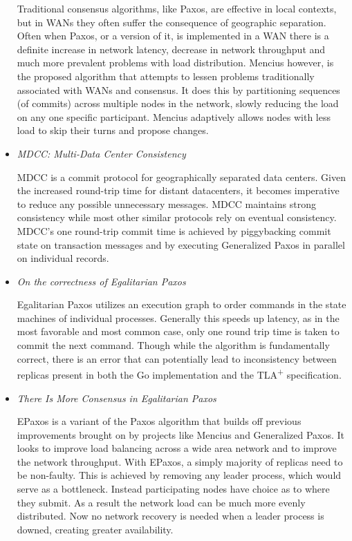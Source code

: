\documentclass{article}
\begin{document}
\begin{itemize}
	Traditional consensus algorithms, like Paxos, are effective in local contexts, but in WANs they often suffer the consequence of geographic separation.
	Often when Paxos, or a version of it, is implemented in a WAN there is a definite increase in network latency, decrease in network throughput and much more prevalent problems with load distribution.
	Mencius however, is the proposed algorithm that attempts to lessen problems traditionally associated with WANs and consensus.
	It does this by partitioning sequences (of commits) across multiple nodes in the network, slowly reducing the load on any one specific participant. Mencius adaptively allows nodes with less load to skip their turns and propose changes.

	\item
	\textit{MDCC: Multi-Data Center Consistency} \cite{MDCC}

	MDCC is a commit protocol for geographically separated data centers.
	Given the increased round-trip time for distant datacenters, it becomes imperative to reduce any possible unnecessary messages. MDCC maintains strong consistency while most other similar protocols rely on eventual consistency.
	MDCC's one round-trip commit time is achieved by piggybacking commit state on transaction messages
	and by executing Generalized Paxos in parallel on individual records.
	

	\item
	\textit{On the correctness of Egalitarian Paxos} \cite{SutraEPaxos}

	Egalitarian Paxos utilizes an execution graph to order commands in the state machines of individual processes.
	Generally this speeds up latency, as in the most favorable and most common case, only one round trip time is taken to commit the next command.
	Though while the algorithm is fundamentally correct, there is an error that can potentially lead to inconsistency between replicas present in both the Go implementation and the TLA\textsuperscript{+} specification. 

	\item
	\textit{There Is More Consensus in Egalitarian Paxos} \cite{EPaxos}

	EPaxos is a variant of the Paxos algorithm that builds off previous improvements brought on by projects like Mencius and Generalized Paxos.
	It looks to improve load balancing across a wide area network and to improve the network throughput. With EPaxos, a simply majority of replicas need to be non-faulty.
	This is achieved by removing any leader process, which would serve as a bottleneck. Instead participating nodes have choice as to where they submit.
	As a result the network load can be much more evenly distributed. Now no network recovery is needed when a leader process is downed, creating greater availability.


\end{itemize}
\end{document}
